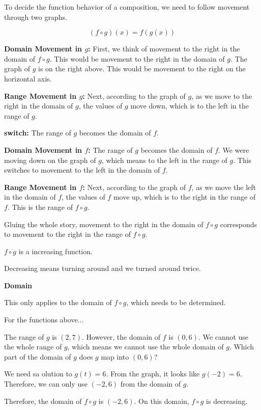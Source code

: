 \documentclass{ximera}
\begin{document}
To decide the function behavior of a composition, we need to follow movement through two graphs. 



\[
(f \circ g)(x) = f(g(x))
\]



\textbf{\textcolor{blue!55!black}{Domain Movement in $g$:}}  First, we think of movement to the right in the domain of $f \circ g$.  This would be movement to the right in the domain of $g$.  The graph of $g$ is on the right above.  This would be movement to the right on the horizontal axis.



\textbf{\textcolor{blue!55!black}{Range Movement in $g$:}}  Next, according to the graph of $g$, as we move to the right in the domain of $g$, the values of $g$ move down, which is to the left in the range of $g$.




\textbf{\textcolor{blue!55!black}{switch:}}   The range of $g$ becomes the domain of $f$.  


\textbf{\textcolor{blue!55!black}{Domain Movement in $f$:}}   The range of $g$ becomes the domain of $f$.  We were moving down on the graph of $g$, which means to the left in the range of $g$.  This switches to movement to the left in the domain of $f$.


\textbf{\textcolor{blue!55!black}{Range Movement in $f$:}}  Next, according to the graph of $f$, as we move the left in the domain of $f$, the values of $f$ move up, which is to the right in the range of $f$.  This is the range of $f \circ g$.




Gluing the whole story, movement to the right in the domain of $f \circ g$ corresponds to movement to the right in the range of $f \circ g$.

$f \circ g$ is a increasing function. 


Decreasing means turning around and we turned around twice. 


\begin{observation} \textbf{\textcolor{-red!75}{Domain}}


This only applies to the domain of $f \circ g$, which needs to be determined. 


For the functions above...

The range of $g$ is $(2, 7)$.  However, the domain of $f$ is $(0, 6)$.   We cannot use the whole range of $g$, which means we cannot use the whole domain of $g$.  Which part of the domain of $g$ does $g$ map into $(0, 6)$? 


We need sa olution to $g(t) = 6$.  From the graph, it looks like $g(-2) = 6$.  Therefore, we can only use $(-2, 6)$ from the domain of $g$.


Therefore, the domain of $f \circ g$ is $(-2, 6)$.  On this domain, $f \circ g$ is decreasing.



\end{observation}
\end{document}
